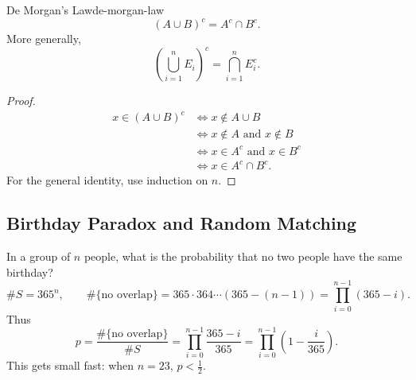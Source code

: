 \begin{theorem}{De Morgan's Law}{de-morgan-law}
  \[
    (A\cup B)^c=A^c\cap B^c.
  \]
  More generally,
  \[
    \left(\bigcup_{i=1}^n E_i\right)^c
    =\bigcap_{i=1}^n E_i^c.
  \]
\end{theorem}

\begin{center}
\end{center}

\begin{proof}
  \begin{align*}
    x\in(A\cup B)^c
     & \iff x\notin A\cup B                \\
     & \iff x\notin A\text{ and }x\notin B \\
     & \iff x\in A^c\text{ and }x\in B^c   \\
     & \iff x\in A^c\cap B^c.
  \end{align*}
  For the general identity, use induction on $n$.
\end{proof}

\newpage
\subsection{Birthday Paradox and Random Matching}

\begin{example}
  In a group of $n$ people, what is the probability that no two people have the same birthday?
  \[
    \#S=365^n,\qquad
    \#\{\text{no overlap}\}
    =365\cdot364\cdots(365-(n-1))
    =\prod_{i=0}^{n-1}(365-i).
  \]
  Thus
  \[
    p=\frac{\#\{\text{no overlap}\}}{\#S}
    =\prod_{i=0}^{n-1}\frac{365-i}{365}
    =\prod_{i=0}^{n-1}\left(1-\frac{i}{365}\right).
  \]
  This gets small fast: when $n=23$, $p<\frac12$.
\end{example}

